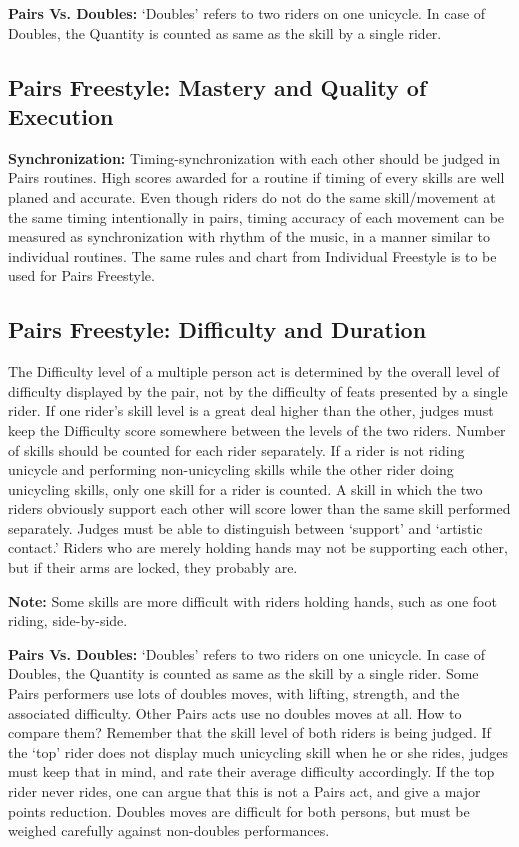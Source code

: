 \textbf{Pairs Vs. Doubles:} `Doubles' refers to two riders on one unicycle.
In case of Doubles, the Quantity is counted as same as the skill by a single rider.

\subsection{Pairs Freestyle: Mastery and Quality of Execution}
\textbf{Synchronization:} Timing-synchronization with each other should be judged in Pairs routines.
High scores awarded for a routine if timing of every skills are well planed and accurate.
Even though riders do not do the same skill/movement at the same timing intentionally in pairs, timing accuracy of each movement can be measured as synchronization with rhythm of the music, in a manner similar to individual routines.
The same rules and chart from Individual Freestyle is to be used for Pairs Freestyle.

\subsection{Pairs Freestyle: Difficulty and Duration \label{subsec:freestyle_pairs-additional-judging-criteria_difficulty-duration}}
The Difficulty level of a multiple person act is determined by the overall level of difficulty displayed by the pair, not by the difficulty of feats presented by a single rider.
If one rider's skill level is a great deal higher than the other, judges must keep the Difficulty score somewhere between the levels of the two riders.
Number of skills should be counted for each rider separately.
If a rider is not riding unicycle and performing non-unicycling skills while the other rider doing unicycling skills, only one skill for a rider is counted.
A skill in which the two riders obviously support each other will score lower than the same skill performed separately.
Judges must be able to distinguish between `support' and `artistic contact.' Riders who are merely holding hands may not be supporting each other, but if their arms are locked, they probably are.

\textbf{Note:} Some skills are more difficult with riders holding hands, such as one foot riding, side-by-side.

\textbf{Pairs Vs. Doubles:} `Doubles' refers to two riders on one unicycle.
In case of Doubles, the Quantity is counted as same as the skill by a single rider.
Some Pairs performers use lots of doubles moves, with lifting, strength, and the associated difficulty.
Other Pairs acts use no doubles moves at all.
How to compare them? Remember that the skill level of both riders is being judged.
If the `top' rider does not display much unicycling skill when he or she rides, judges must keep that in mind, and rate their average difficulty accordingly.
If the top rider never rides, one can argue that this is not a Pairs act, and give a major points reduction.
Doubles moves are difficult for both persons, but must be weighed carefully against non-doubles performances.

